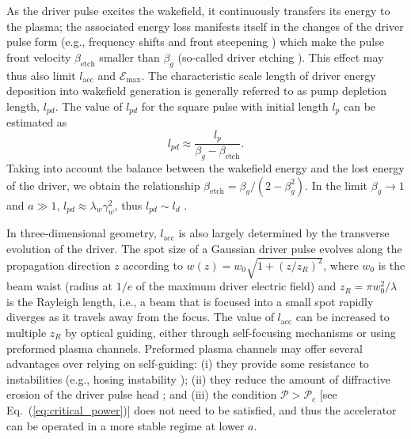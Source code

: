 \documentclass[10pt, a4paper, twoside, openright]{report}
\begin{document}
As the driver pulse excites the wakefield, it continuously transfers its energy to the plasma; the associated energy loss manifests itself in the changes of the driver pulse form (e.g., frequency shifts \cite{Esarey1990, Shadwick2009} and front steepening \cite{Bulanov1992, Esarey2000, Gordon2003}) which make the pulse front velocity $ \beta_{\mathrm{etch}} $ smaller than $ \beta_g $ (so-called driver etching \cite{Nakajima2011}). This effect may thus also limit $ l_{\mathrm{acc}} $ and $ \mathcal{E}_{\mathrm{max}} $. The characteristic scale length of driver energy deposition into wakefield generation is generally referred to as pump depletion length, $ l_{pd} $. The value of $ l_{pd} $ for the square pulse with initial length $ l_p $ can be estimated as \cite{Bulanov2016}
\begin{equation}\label{key}
	l_{pd} \approx \frac{l_p}{\beta_g - \beta_{\mathrm{etch}}}.
\end{equation}
Taking into account the balance between the wakefield energy and the lost energy of the driver, we obtain the relationship $ \beta_{\mathrm{etch}} = \beta_g / \left( 2 - \beta_g^2 \right) $. In the limit $ \beta_g \rightarrow 1 $ and $ a \gg 1 $, $ l_{pd} \approx \lambda_w \gamma_w^2 $, thus $ l_{pd} \sim l_d $ \cite{Bulanov2016}.

In three-dimensional geometry, $ l_{\mathrm{acc}} $ is also largely determined by the transverse evolution of the driver. The spot size of a Gaussian driver pulse evolves along the propagation direction $ z $ according to $ w \left( z \right) = w_0 \sqrt{1 + \left( z / z_R \right)^2} $, where $ w_0 $ is the beam waist (radius at $ 1 / e $ of the maximum driver electric field) and $ z_R = \pi w_0^2 / \lambda $ is the Rayleigh length, i.e., a beam that is focused into a small spot rapidly diverges as it travels away from the focus. The value of $ l_{\mathrm{acc}} $ can be increased to multiple $ z_{R} $ by optical guiding, either through self-focusing mechanisms or using preformed plasma channels. Preformed plasma channels may offer several advantages over relying on self-guiding: (i) they provide some resistance to instabilities (e.g., hosing instability \cite{Shvets1994, Sprangle1994}); (ii) they reduce the amount of diffractive erosion of the driver pulse head \cite{Sprangle1990, Esarey1997}; and (iii) the condition $ \mathcal{P} > \mathcal{P}_c $ [see Eq.~(\ref{eq:critical_power})] does not need to be satisfied, and thus the accelerator can be operated in a more stable regime at lower $ a $.
\end{document}
